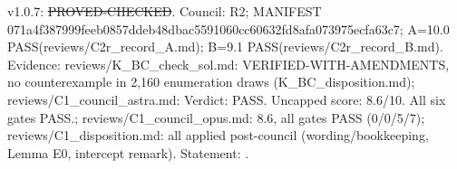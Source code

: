 \begin{lemma}\label{reg:W3-POST2_B}
\end{lemma}
\begin{statusbox}
 v1.0.7: \st{PROVED-CHECKED}. Council: R2; MANIFEST 071a4f387999feeb0857ddeb48dbac5591060cc60632fd8afa073975ecfa63c7; A=10.0 PASS(reviews/C2r\_record\_A.md); B=9.1 PASS(reviews/C2r\_record\_B.md). Evidence: reviews/K\_BC\_check\_sol.md: VERIFIED-WITH-AMENDMENTS, no counterexample in 2,160 enumeration draws (K\_BC\_disposition.md); reviews/C1\_council\_astra.md: Verdict: PASS. Uncapped score: 8.6/10. All six gates PASS.; reviews/C1\_council\_opus.md: 8.6, all gates PASS (0/0/5/7); reviews/C1\_disposition.md: all applied post-council (wording/bookkeeping, Lemma E0, intercept remark). Statement: .
\end{statusbox}
